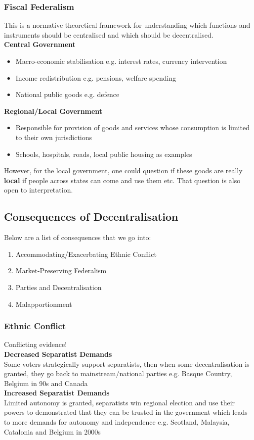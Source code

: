 \documentclass[12pt, letterpaper]{article}
\begin{document}
\subsubsection{Fiscal Federalism}
This is a normative theoretical framework for understanding which functions and instruments should be centralised and which should be decentralised.\\
\textbf{Central Government}
\begin{itemize}
	\item Macro-economic stabilisation e.g. interest rates, currency intervention
	\item Income redistribution e.g. pensions, welfare spending
	\item National public goods e.g. defence
\end{itemize}
\textbf{Regional/Local Government}
\begin{itemize}
	\item Responsible for provision of goods and services whose consumption is limited to their own jurisdictions
	\item Schools, hospitals, roads, local public housing as examples
\end{itemize}
However, for the local government, one could question if these goods are really \textbf{local} if people across states can come and use them etc. That question is also open to interpretation.

\subsection{Consequences of Decentralisation}
Below are a list of consequences that we go into:
\begin{enumerate}
	\item Accommodating/Exacerbating Ethnic Conflict
	\item Market-Preserving Federalism
	\item Parties and Decentralisation
	\item Malapportionment
\end{enumerate}

\subsubsection{Ethnic Conflict}
Conflicting evidence!\\
\textbf{Decreased Separatist Demands}\\
Some voters strategically support separatists, then when some decentralisation is granted, they go back to mainstream/national parties e.g. Basque Country, Belgium in 90s and Canada\\
\textbf{Increased Separatist Demands}\\
Limited autonomy is granted, separatists win regional election and use their powers to demonstrated that they can be trusted in the government which leads to more demands for autonomy and independence e.g. Scotland, Malaysia, Catalonia and Belgium in 2000s
\end{document}
